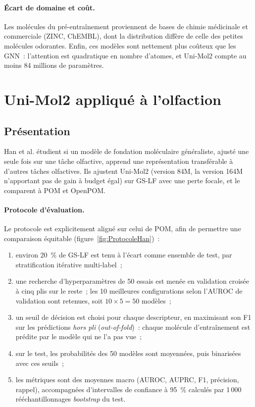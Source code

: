 \paragraph{Écart de domaine et coût.}
Les molécules du pré-entraînement proviennent de bases de chimie médicinale et commerciale (ZINC, ChEMBL), dont la distribution diffère de celle des petites molécules odorantes.
Enfin, ces modèles sont nettement plus coûteux que les GNN~: l'attention est quadratique en nombre d'atomes, et Uni-Mol2 compte au moins 84 millions de paramètres.


\section{Uni-Mol2 appliqué à l'olfaction}
\label{sec:EAHan}

\subsection{Présentation}

Han et al. \cite{Han-2026} étudient si un modèle de fondation moléculaire généraliste, ajusté une seule fois sur une tâche olfactive, apprend une représentation transférable à d'autres tâches olfactives.
Ils ajustent Uni-Mol2 (version 84M, la version 164M n'apportant pas de gain à budget égal) sur GS-LF avec une perte focale, et le comparent à POM et OpenPOM.

\paragraph{Protocole d'évaluation.}
Le protocole est explicitement aligné sur celui de POM, afin de permettre une comparaison équitable (figure~\ref{fig:ProtocoleHan})~:
\begin{enumerate}
   \item environ 20~\% de GS-LF est tenu à l'écart comme ensemble de test, par stratification itérative multi-label~;
   \item une recherche d'hyperparamètres de 50 essais est menée en validation croisée à cinq plis sur le reste~; les 10 meilleures configurations selon l'AUROC de validation sont retenues, soit $10 \times 5 = 50$ modèles~;
   \item un seuil de décision est choisi pour chaque descripteur, en maximisant son F1 sur les prédictions \emph{hors pli} (\emph{out-of-fold})~: chaque molécule d'entraînement est prédite par le modèle qui ne l'a pas vue~;
   \item sur le test, les probabilités des 50 modèles sont moyennées, puis binarisées avec ces seuils~;
   \item les métriques sont des moyennes macro (AUROC, AUPRC, F1, précision, rappel), accompagnées d'intervalles de confiance à 95~\% calculés par 1\,000 rééchantillonnages \emph{bootstrap} du test.
\end{enumerate}

